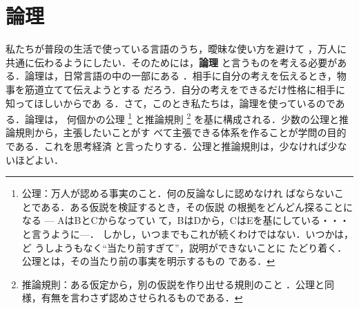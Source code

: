 ﻿%

        \section{論理}
            私たちが普段の生活で使っている言語のうち，曖昧な使い方を避けて
            ，万人に共通に伝わるようにしたい．そのためには，\textbf{論理}
            と言うものを考える必要がある．論理は，日常言語の中の一部にある
            ．相手に自分の考えを伝えるとき，物事を筋道立てて伝えようとする
            だろう．自分の考えをできるだけ性格に相手に知ってほしいからであ
            る．さて，このとき私たちは，論理を使っているのである．論理は，
            何個かの公理
                \footnote{
                    公理：万人が認める事実のこと．何の反論なしに認めなけれ
                    ばならないことである．ある仮説を検証するとき，その仮説
                    の根拠をどんどん探ることになる --- AはBとCからなってい
                    て，BはDから，CはEを基にしている・・・と言うように---．
                    しかし，いつまでもこれが続くわけではない．いつかは，ど
                    うしようもなく“当たり前すぎて”，説明ができないことに
                    たどり着く．公理とは，その当たり前の事実を明示するもの
                    である．
                }
            と推論規則
                \footnote{
                    推論規則：ある仮定から，別の仮説を作り出せる規則のこと
                    ．公理と同様，有無を言わさず認めさせられるものである．
                }
            を基に構成される．少数の公理と推論規則から，主張したいことがす
            べて主張できる体系を作ることが学問の目的である．これを思考経済
            と言ったりする．公理と推論規則は，少なければ少ないほどよい．



